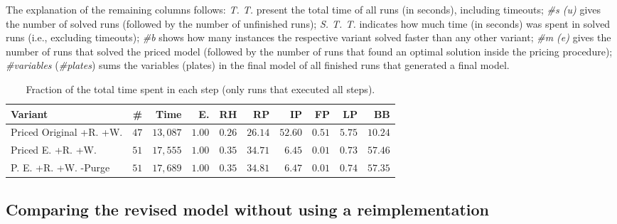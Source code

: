 \documentclass[smallextended]{svjour3}       %
\begin{document}
The explanation of the remaining columns follows: \emph{T. T.} present the total time of all runs (in seconds), including timeouts; \emph{\#s (u)} gives the number of solved runs (followed by the number of unfinished runs); \emph{S. T. T.} indicates how much time (in seconds) was spent in solved runs (i.e., excluding timeouts); \emph{\#b} shows how many instances the respective variant solved faster than any other variant; \emph{\#m (e)} gives the number of runs that solved the priced model (followed by the number of runs that found an optimal solution inside the pricing procedure); \emph{\#variables} (\emph{\#plates}) sums the variables (plates) in the final model of all finished runs that generated a final model.

\begin{table}
\caption{Fraction of the total time spent in each step (only runs that executed all steps).}
\begin{tabular}{lrrrrrrrrr}
\hline\hline
\textbf{Variant} & \textbf{\#} & \textbf{Time} & \textbf{E.} & \textbf{RH} & \textbf{RP} & \textbf{IP} & \textbf{FP} & \textbf{LP} & \textbf{BB} \\\hline
Priced Original +R. +W. & \(47\) & \(13,087\) & \(1.00\) & \(0.26\) & \(26.14\) & \(52.60\) & \(0.51\) & \(5.75\) & \(10.24\) \\
Priced E. +R. +W. & \(51\) & \(17,555\) & \(1.00\) & \(0.35\) & \(34.71\) & \(6.45\) & \(0.01\) & \(0.73\) & \(57.46\) \\
P. E. +R. +W. -Purge & \(51\) & \(17,689\) & \(1.00\) & \(0.35\) & \(34.81\) & \(6.47\) & \(0.01\) & \(0.74\) & \(57.35\) \\\hline\hline
\end{tabular}
\end{table}

\subsection{Comparing the revised model without using a reimplementation}
\end{document}
